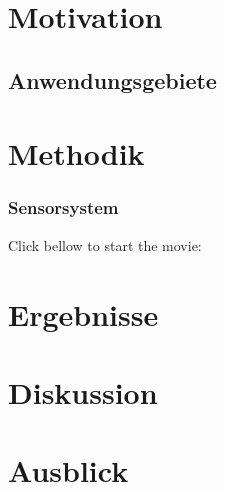 \section{Motivation}
\subsection{Anwendungsgebiete}
\section{Methodik}
\begin{frame}
  \frametitle{Sensorsystem}
  Click bellow to start the movie:\\
\end{frame}
\section{Ergebnisse}
\section{Diskussion}
\section{Ausblick}
